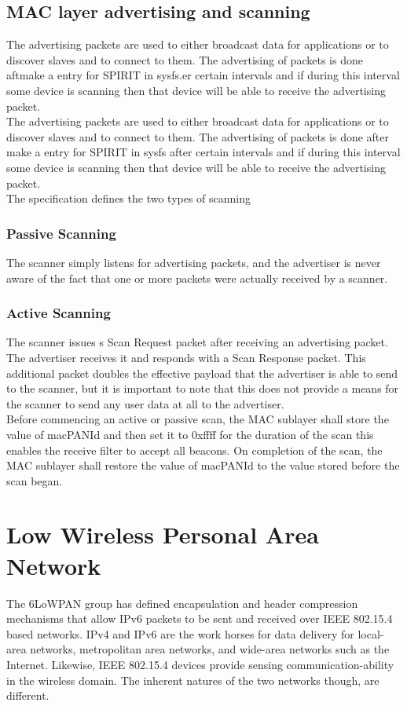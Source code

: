 \subsection{MAC layer advertising and scanning}
The advertising packets are used to either broadcast data for applications or to discover slaves and to connect to them. The advertising of packets is done aftmake a entry for SPIRIT in sysfs.er certain intervals and if during this interval some device is scanning then that device will be able to receive the advertising packet.\\
The advertising packets are used to either broadcast data for applications or to discover slaves and to connect to them. The advertising of packets is done after make a entry for SPIRIT in sysfs after certain intervals and if during this interval some device is scanning then that device will be able to receive the advertising packet.\\
The specification defines the two types of scanning\\
\subsubsection{Passive Scanning}
The scanner simply listens for advertising packets, and the advertiser is never aware of the fact that one or more packets were actually received by a scanner.
\subsubsection{Active Scanning}
The scanner issues s Scan Request packet after receiving an advertising packet. The advertiser receives it and responds with a Scan Response packet. This additional packet doubles the effective payload that the advertiser is able to send to the scanner, but it is important to note that this does not provide a means for the scanner to send any user data at all to the advertiser.\\
Before commencing an active or passive scan, the MAC sublayer shall store the value of macPANId and then set it to 0xffff for the duration of the scan this enables the receive filter to accept all beacons. On completion of the scan, the MAC sublayer shall restore the value of macPANId to the value stored before the scan began.
\section{Low Wireless Personal Area Network}
The 6LoWPAN group has defined encapsulation and header compression mechanisms that allow IPv6 packets to be sent and received over IEEE 802.15.4 based networks. IPv4 and IPv6 are the work horses for data delivery for local-area networks, metropolitan area networks, and wide-area networks such as the Internet. Likewise, IEEE 802.15.4 devices provide sensing communication-ability in the wireless domain. The inherent natures of the two networks though, are different.
